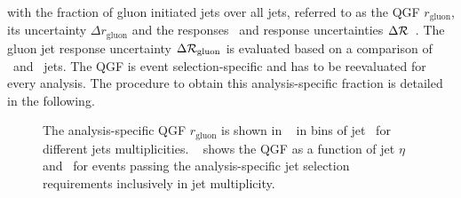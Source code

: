 %
with the fraction of gluon initiated jets over all jets, referred to as the \gls{QGF} $r_\mathrm{gluon}$, its uncertainty $\Delta r_\mathrm{gluon}$ and the responses \resp\ and response uncertainties $\Delta \mathcal R$~\cite{ATLASCollaboration2015b}. The gluon jet response uncertainty $\Delta \mathcal R_\mathrm{gluon}$ is evaluated based on a comparison of \Pythia\ and \Herwig\ jets.
%
The \gls{QGF} is event selection-specific and has to be reevaluated for every analysis.
%
The procedure to obtain this analysis-specific fraction is detailed in the following.











% 
\begin{figure}[tb!]
\centering
{}
\caption[\gls{QGF} for $\sqrts=7$~\TeV\ data]{
The analysis-specific \gls{QGF} $r_\mathrm{gluon}$ is shown in \fig~ in bins of jet \pt\ for different jets multiplicities. 
%
\Fig~ shows the \gls{QGF} as a function of jet $\eta$ and \pt\ for events passing the analysis-specific jet selection requirements inclusively in jet multiplicity. 
%
\label{fig:qgf7TeV}}
\end{figure}


